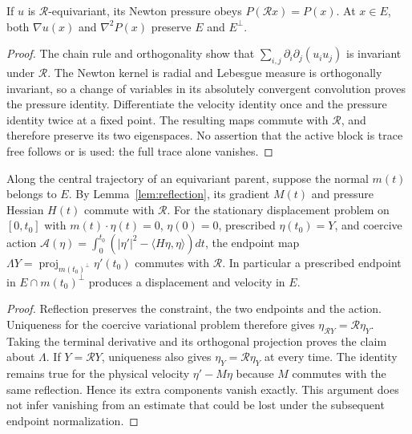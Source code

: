 \begin{lemma}\label{lem:reflection}
If $u$ is $\mathcal R$-equivariant, its Newton pressure obeys
$P(\mathcal R x)=P(x)$. At $x\in E$, both $\nabla u(x)$ and
$\nabla^2P(x)$ preserve $E$ and $E^\perp$.
\end{lemma}
\begin{proof}
The chain rule and orthogonality show that
$\sum_{i,j}\partial_i\partial_j(u_i u_j)$ is invariant under
$\mathcal R$. The Newton kernel is radial and Lebesgue measure is
orthogonally invariant, so a change of variables in its absolutely
convergent convolution proves the pressure identity. Differentiate the
velocity identity once and the pressure identity twice at a fixed point.
The resulting maps commute with $\mathcal R$, and therefore preserve its
two eigenspaces. No assertion that the active block is trace free follows
or is used: the full trace alone vanishes.
\end{proof}

\begin{lemma}\label{lem:endpoint-symmetry}
Along the central trajectory of an equivariant parent, suppose the normal
$m(t)$ belongs to $E$. By Lemma~\ref{lem:reflection}, its gradient $M(t)$
and pressure Hessian $H(t)$ commute with $\mathcal R$. For the
stationary displacement problem on $[0,t_0]$ with
$m(t)\cdot\eta(t)=0$, $\eta(0)=0$, prescribed $\eta(t_0)=Y$, and
coercive action
$\mathcal A(\eta)=\int_0^{t_0}(|\eta'|^2-\langle H\eta,\eta\rangle)dt$,
the endpoint map $\Lambda Y=\operatorname{proj}_{m(t_0)^\perp}\eta'(t_0)$
commutes with $\mathcal R$. In particular a prescribed endpoint in
$E\cap m(t_0)^\perp$ produces a displacement and velocity in $E$.
\end{lemma}
\begin{proof}
Reflection preserves the constraint, the two endpoints and the action.
Uniqueness for the coercive variational problem therefore gives
$\eta_{\mathcal RY}=\mathcal R\eta_Y$. Taking the terminal derivative
and its orthogonal projection proves the claim about $\Lambda$.
If $Y=\mathcal RY$, uniqueness also gives
$\eta_Y=\mathcal R\eta_Y$ at every time. The identity remains true for
the physical velocity $\eta'-M\eta$ because $M$ commutes with the same
reflection. Hence its extra components vanish exactly. This argument
does not infer vanishing from an estimate that could be lost under the
subsequent endpoint normalization.
\end{proof}
